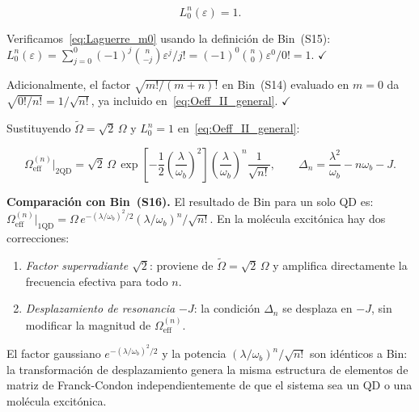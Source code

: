 \documentclass[12pt]{article}
\begin{document}
	\begin{equation}
		L_0^n(\varepsilon) = 1.
		\label{eq:Laguerre_m0}
	\end{equation}
	
	\noindent
	Verificamos~\eqref{eq:Laguerre_m0} usando la definici\'on de Bin~(S15):
	$L_0^n(\varepsilon) = \sum_{j=0}^{0}(-1)^j\binom{n}{-j}\varepsilon^j/j!
	= (-1)^0\binom{n}{0}\varepsilon^0/0! = 1$. $\checkmark$
	
	\noindent
	Adicionalmente, el factor $\sqrt{m!/(m+n)!}$ en Bin~(S14) evaluado en
	$m=0$ da $\sqrt{0!/n!} = 1/\sqrt{n!}$, ya incluido
	en~\eqref{eq:Oeff_II_general}. $\checkmark$
	
	\medskip
	\noindent
	Sustituyendo $\widetilde\Omega = \sqrt{2}\,\Omega$
	y $L_0^n = 1$ en~\eqref{eq:Oeff_II_general}:
	
	\begin{equation}
		\boxed{
			\Omega_\mathrm{eff}^{(n)}\big|_{2\mathrm{QD}}
			= \sqrt{2}\,\Omega\,
			\exp\!\left[-\frac{1}{2}\!\left(\frac{\lambda}{\omega_b}\right)^{\!2}\right]
			\left(\frac{\lambda}{\omega_b}\right)^n
			\frac{1}{\sqrt{n!}},
			\qquad
			\Delta_n = \frac{\lambda^2}{\omega_b} - n\omega_b - J.
		}
		\label{eq:resultado_II}
	\end{equation}
	
	\medskip
	\noindent
	\textbf{Comparaci\'on con Bin~(S16).}
	El resultado de Bin para un solo QD es:
	$\Omega_\mathrm{eff}^{(n)}|_\mathrm{1QD}
	= \Omega\,e^{-(\lambda/\omega_b)^2/2}(\lambda/\omega_b)^n/\sqrt{n!}$.
	En la mol\'ecula excit\'onica hay dos correcciones:
	
	\begin{enumerate}
		\item \textit{Factor superradiante $\sqrt{2}$}: proviene de
		$\widetilde\Omega = \sqrt{2}\,\Omega$ y amplifica directamente la
		frecuencia efectiva para todo $n$.
		
		\item \textit{Desplazamiento de resonancia $-J$}: la condici\'on
		$\Delta_n$ se desplaza en $-J$, sin modificar la magnitud de
		$\Omega_\mathrm{eff}^{(n)}$.
	\end{enumerate}
	
	\noindent
	El factor gaussiano $e^{-(\lambda/\omega_b)^2/2}$ y la potencia
	$(\lambda/\omega_b)^n/\sqrt{n!}$ son id\'enticos a Bin: la
	transformaci\'on de desplazamiento genera la misma estructura
	de elementos de matriz de Franck-Condon independientemente de
	que el sistema sea un QD o una mol\'ecula excit\'onica.
	
\end{document}
